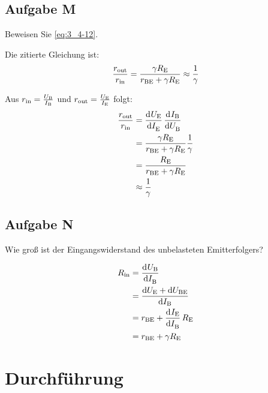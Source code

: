 \FloatBarrier
\subsection{Aufgabe M}

\begin{problem}
	Beweisen Sie \eqref{eq:3_4-12}.
\end{problem}

Die zitierte Gleichung ist:
\begin{equation}
	\label{eq:3_4-12}
	\frac{r_\text{out}}{r_\text{in}}
	= \frac{\gamma R_\text{E}}{r_\text{BE} + \gamma R_\text{E}}
	\approx \frac 1\gamma
\end{equation}

Aus $r_\text{in}=\frac{U_\text{B}}{I_\text{B}}$ und $r_\text{out}=\frac{U_\text{E}}{I_\text{E}}$ folgt:
\begin{align*}
	\frac{r_\text{out}}{r_\text{in}} &= \dod\UE\IE \dod\IB\UB\\
	&= \frac{\gamma\RE}{r_\text{BE}+\gamma\RE}\frac1\gamma\\
	&= \frac{\RE}{r_\text{BE}+\gamma\RE}\\
	&\approx \frac 1\gamma
\end{align*}

\FloatBarrier
\subsection{Aufgabe N}

\begin{problem}
	Wie groß ist der Eingangswiderstand des unbelasteten Emitterfolgers?
\end{problem}

\begin{align*}
	R_\text{in} &= \dod\UB\IB\\
	&= \frac {\dif\UE+\dif\UBE}{\dif\IB}\\
	&= r_\text{BE} + \dod \IE\IB \RE\\
	&= r_\text{BE} + \gamma\RE
\end{align*}


\FloatBarrier
\section{Durchführung}

